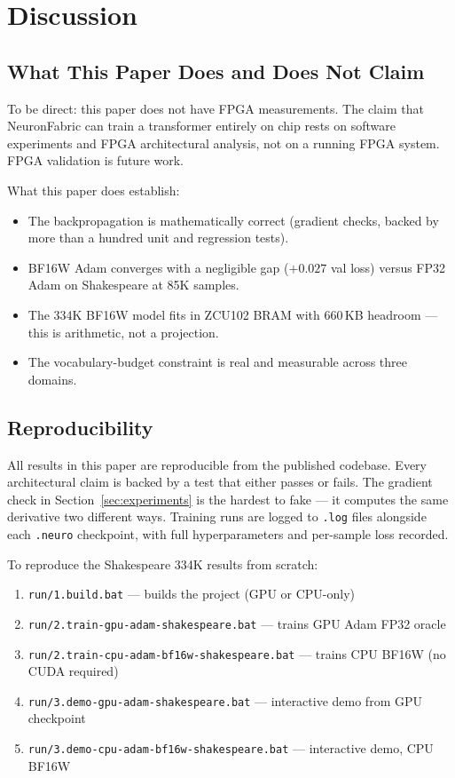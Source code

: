 \documentclass[11pt]{article}
\begin{document}
\section{Discussion}

\subsection{What This Paper Does and Does Not Claim}

To be direct: this paper does not have FPGA measurements. The claim that NeuronFabric
can train a transformer entirely on chip rests on software experiments and FPGA
architectural analysis, not on a running FPGA system. FPGA validation is future work.

What this paper does establish:

\begin{itemize}
  \item The backpropagation is mathematically correct (gradient checks, backed by more than a hundred unit and regression tests).
  \item BF16W Adam converges with a negligible gap ($+0.027$ val loss) versus FP32 Adam on Shakespeare at 85K samples.
  \item The 334K BF16W model fits in ZCU102 BRAM with 660\,KB headroom --- this is
    arithmetic, not a projection.
  \item The vocabulary-budget constraint is real and measurable across three domains.
\end{itemize}

\subsection{Reproducibility}

All results in this paper are reproducible from the published codebase.
Every architectural claim is backed by a test that either passes or fails.
The gradient check in Section~\ref{sec:experiments} is the hardest to fake ---
it computes the same derivative two different ways. Training runs are logged
to \texttt{.log} files alongside each \texttt{.neuro} checkpoint, with full
hyperparameters and per-sample loss recorded.

To reproduce the Shakespeare 334K results from scratch:
\begin{enumerate}
  \item \texttt{run/1.build.bat} --- builds the project (GPU or CPU-only)
  \item \texttt{run/2.train-gpu-adam-shakespeare.bat} --- trains GPU Adam FP32 oracle
  \item \texttt{run/2.train-cpu-adam-bf16w-shakespeare.bat} --- trains CPU BF16W (no CUDA required)
  \item \texttt{run/3.demo-gpu-adam-shakespeare.bat} --- interactive demo from GPU checkpoint
  \item \texttt{run/3.demo-cpu-adam-bf16w-shakespeare.bat} --- interactive demo, CPU BF16W
\end{enumerate}
\end{document}
